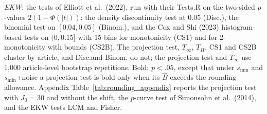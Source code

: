 \begin{table}[htbp]
\begin{minipage}{\linewidth}
\textit{EKW}: the tests of Elliott et al.\ (2022), run with their Tests.R on the two-sided $p$-values $2(1-\Phi(|t|))$: the density discontinuity test at 0.05 (Disc.), the binomial test on $[0.04,0.05]$ (Binom.), and the Cox and Shi (2023) histogram-based tests on $(0,0.15]$ with 15 bins for monotonicity (CS1) and for 2-monotonicity with bounds (CS2B).
The projection test, $T_\infty$, $T_H$, CS1 and CS2B cluster by article, and Disc.\@ and Binom. do not; the projection test and $T_\infty$ use 1,000 article-level bootstrap repetitions.
Bold: $p<.05$, except that under $s_{\min}$ and $s_{\min}$+noise a projection test is bold only when its $\widehat{B}$ exceeds the rounding allowance.
Appendix Table~\ref{tab:rounding_appendix} reports the projection test with $J_0=30$ and without the shift, the $p$-curve test of Simonsohn et al.\ (2014), and the EKW tests LCM and Fisher.
\end{minipage}
\end{table}
